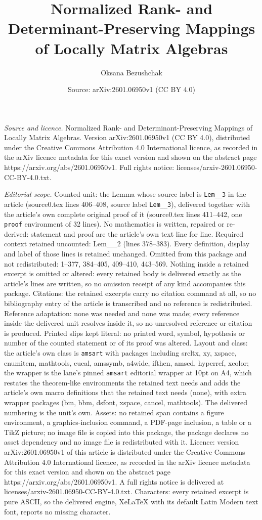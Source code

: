 \documentclass[10pt,a4paper]{amsart}
\title[Normalized Rank- and Determinant-Preserving Mappings of Loca]{Normalized Rank- and Determinant-Preserving Mappings of Locally Matrix Algebras}
\author{Oksana Bezushchak}
\date{Source: arXiv:2601.06950v1 (CC BY 4.0)}
\begin{document}
\maketitle

\noindent\emph{Source and licence.} Normalized Rank- and Determinant-Preserving Mappings of Locally Matrix Algebras. Version arXiv:2601.06950v1 (CC BY 4.0), distributed under the Creative Commons Attribution 4.0 International licence, as recorded in the arXiv licence metadata for this exact version and shown on the abstract page https://arxiv.org/abs/2601.06950v1. Full rights notice: licenses/arxiv-2601.06950-CC-BY-4.0.txt.\par\smallskip

\noindent\textit{Editorial scope.} Counted unit: the Lemma whose source label is \texttt{Lem\_\_3} in the article (source0.tex lines 406--408, source label \texttt{Lem\_\_3}), delivered together with the article's own complete original proof of it (source0.tex lines 411--442, one \texttt{proof} environment of 32 lines). No mathematics is written, repaired or re-derived: statement and proof are the article's own text line for line. Required context retained uncounted: Lem\_\_2 (lines 378--383). Every definition, display and label of those lines is retained unchanged. Omitted from this package and not redistributed: 1--377, 384--405, 409--410, 443--569. Nothing inside a retained excerpt is omitted or altered: every retained body is delivered exactly as the article's lines are written, so no omission receipt of any kind accompanies this package. Citations: the retained excerpts carry no citation command at all, so no bibliography entry of the article is transcribed and no reference is redistributed. Reference adaptation: none was needed and none was made; every reference inside the delivered unit resolves inside it, so no unresolved reference or citation is produced. Printed slips kept literal: no printed word, symbol, hypothesis or number of the counted statement or of its proof was altered. Layout and class: the article's own class is \texttt{amsart} with packages including srcltx, xy, xspace, enumitem, mathtools, eucal, amssymb, a4wide, ifthen, amscd, hyperref, xcolor; the wrapper is the lane's pinned \texttt{amsart} editorial wrapper at 10pt on A4, which restates the theorem-like environments the retained text needs and adds the article's own macro definitions that the retained text needs (none), with extra wrapper packages (bm, bbm, dsfont, xspace, cancel, mathtools). The delivered numbering is the unit's own. Assets: no retained span contains a figure environment, a graphics-inclusion command, a PDF-page inclusion, a table or a TikZ picture; no image file is copied into this package, the package declares no asset dependency and no image file is redistributed with it. Licence: version arXiv:2601.06950v1 of this article is distributed under the Creative Commons Attribution 4.0 International licence, as recorded in the arXiv licence metadata for this exact version and shown on the abstract page https://arxiv.org/abs/2601.06950v1. A full rights notice is delivered at licenses/arxiv-2601.06950-CC-BY-4.0.txt. Characters: every retained excerpt is pure ASCII, so the delivered engine, XeLaTeX with its default Latin Modern text font, reports no missing character.
\end{document}
